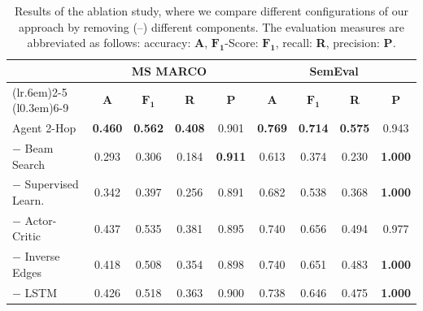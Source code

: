 \begin{table}
\centering
\caption{Results of the ablation study, where we compare different configurations of our approach by removing (--) different components. The evaluation measures are 
abbreviated as follows: accuracy: \textbf{A}, $\mathbf{F_1}$-Score: $\mathbf{F_1}$, recall: \textbf{R}, precision: \textbf{P}.}
\small
\renewcommand{\tabcolsep}{1.7pt}
\label{table-ablation}
  \begin{tabular}{@{}lcccccccc@{}} 
    \toprule
    & \multicolumn{4}{c}{\textbf{MS MARCO}} & \multicolumn{4}{c}{\textbf{SemEval}}  \\
    \cmidrule(lr{.6em}){2-5} \cmidrule(l{0.3em}){6-9}
    &\textbf{A} & \textbf{$\mathbf{F_1}$} & \textbf{R} & \textbf{P} & \textbf{A} & \textbf{$\mathbf{F_1}$} & \textbf{R} & \textbf{P}\\
    \midrule
    Agent 2-Hop & \textbf{0.460} & \textbf{0.562} & \textbf{0.408} & 0.901 & \textbf{0.769} & \textbf{0.714} & \textbf{0.575} & 0.943 \\ 
    \midrule
    $\mathbf{-}$ Beam Search       & 0.293 & 0.306 & 0.184 & \textbf{0.911} & 0.613 & 0.374 & 0.230 & \textbf{1.000} \\
    $\mathbf{-}$ Supervised Learn. & 0.342 & 0.397 & 0.256 &         0.891  & 0.682 & 0.538 & 0.368 & \textbf{1.000} \\
    $\mathbf{-}$ Actor-Critic      & 0.437 & 0.535 & 0.381 &         0.895  & 0.740 & 0.656 & 0.494 &         0.977  \\
    $\mathbf{-}$ Inverse Edges     & 0.418 & 0.508 & 0.354 &         0.898  & 0.740 & 0.651 & 0.483 & \textbf{1.000} \\
    $\mathbf{-}$ LSTM              & 0.426 & 0.518 & 0.363 &         0.900  & 0.738 & 0.646 & 0.475 & \textbf{1.000} \\
    \bottomrule
  \end{tabular}
\end{table}
